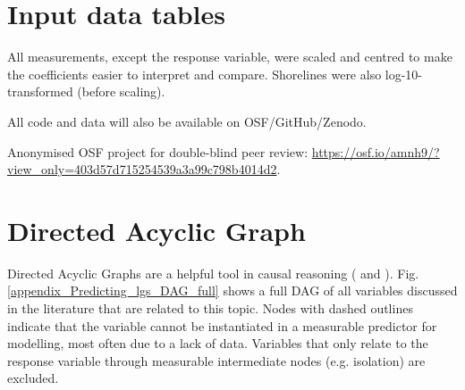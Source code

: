 \documentclass[12pt,letterpaper]{article}
\begin{document}
\section{Input data tables}
\singlespacing
\label{appendix_data tables}
All measurements, except the response variable, were scaled and centred to make the coefficients easier to interpret and compare. Shorelines were also log-10-transformed (before scaling). 

All code and data will also be available on OSF/GitHub/Zenodo.

Anonymised OSF project for double-blind peer review: \url{https://osf.io/amnh9/?view_only=403d57d715254539a3a99c798b4014d2}.

\begin{landscape}



\end{landscape}
\newpage

\section{Directed Acyclic Graph}
\label{appendix_DAG_def}
Directed Acyclic Graphs are a helpful tool in causal reasoning (\citet{pearl1995causal} and \citet{mcelreath2020statistical}). Fig. \ref{appendix_Predicting_lgs_DAG_full} shows a full DAG of all variables discussed in the literature that are related to this topic. Nodes with dashed outlines indicate that the variable cannot be instantiated in a measurable predictor for modelling, most often due to a lack of data. Variables that only relate to the response variable through measurable intermediate nodes (e.g. isolation) are excluded.
 
\end{document}
